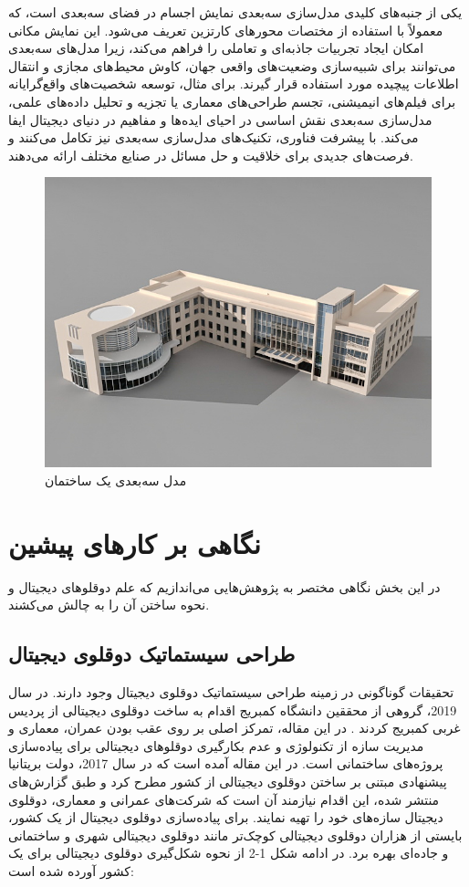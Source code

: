 یکی از جنبه‌های کلیدی مدل‌سازی سه‌بعدی نمایش اجسام در فضای سه‌بعدی است، که معمولاً با استفاده از مختصات محورهای کارتزین تعریف می‌شود. این نمایش مکانی امکان ایجاد تجربیات جاذبه‌ای و تعاملی را فراهم می‌کند، زیرا مدل‌های سه‌بعدی می‌توانند برای شبیه‌سازی وضعیت‌های واقعی جهان، کاوش محیط‌های مجازی و انتقال اطلاعات پیچیده مورد استفاده قرار گیرند. برای مثال، توسعه شخصیت‌های واقع‌گرایانه برای فیلم‌های انیمیشنی، تجسم طراحی‌های معماری یا تجزیه و تحلیل داده‌های علمی، مدل‌سازی سه‌بعدی نقش اساسی در احیای ایده‌ها و مفاهیم در دنیای دیجیتال ایفا می‌کند. با پیشرفت فناوری، تکنیک‌های مدل‌سازی سه‌بعدی نیز تکامل می‌کنند و فرصت‌های جدیدی برای خلاقیت و حل مسائل در صنایع مختلف ارائه می‌دهند.

\begin{figure}[h]
    \centering
    \includegraphics[width=0.7\linewidth]{3D_Model.png}
    \caption{مدل سه‌بعدی یک ساختمان}
    \label{fig:3D_Model}
\end{figure}


\section{نگاهی بر کار‌های پیشین}

در این بخش نگاهی مختصر به پژوهش‌هایی می‌اندازیم که علم دوقلوهای دیجیتال و نحوه ساختن آن را به چالش می‌کشند.

\subsection{طراحی سیستماتیک دوقلوی دیجیتال}

تحقیقات گوناگونی در زمینه طراحی سیستماتیک دوقلوی دیجیتال وجود دارند. در سال 2019، گروهی از محققین دانشگاه کمبریج اقدام به ساخت دوقلوی دیجیتالی از پردیس غربی کمبریج کردند \cite{lu2020developing}. در این مقاله، تمرکز اصلی بر روی عقب بودن عمران، معماری و مدیریت سازه از تکنولوژی و عدم بکارگیری دوقلوهای دیجیتالی برای پیاده‌سازی پروژه‌های ساختمانی است. در این مقاله آمده است که در سال 2017، دولت بریتانیا پیشنهادی مبتنی بر ساختن دوقلوی دیجیتالی از کشور مطرح کرد و طبق گزارش‌های منتشر شده، این اقدام نیازمند آن است که شرکت‌های عمرانی و معماری، دوقلوی دیجیتال سازه‌های خود را تهیه نمایند. برای پیاده‌سازی دوقلوی دیجیتال از یک کشور، بایستی از هزاران دوقلوی دیجیتالی کوچک‌تر مانند دوقلوی دیجیتالی شهری و ساختمانی و جاده‌ای بهره برد. در ادامه شکل 1-2 از نحوه شکل‌گیری دوقلوی دیجیتالی برای یک کشور آورده شده است:

